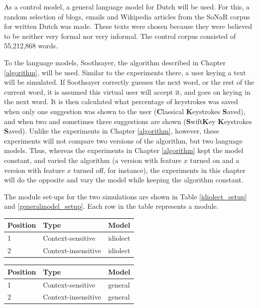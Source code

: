 \documentclass[11pt]{article}
\let\originaltable\table
\let\endoriginaltable\endtable
\renewenvironment{table}[1][ht]{%
  \originaltable[#1]
  \centering}%
  {\endoriginaltable}
\begin{document}
As a control model, a general language model for Dutch will be used. For this, a random selection of blogs, emails and Wikipedia articles from the SoNaR corpus for written Dutch \cite{oostdijk+13} was made. These texts were chosen because they were believed to be neither very formal nor very informal. The control corpus consisted of 55,212,868 words.

To the language models, Soothsayer, the algorithm described in Chapter \ref{algorithm}, will be used. Similar to the experiments there, a user keying a text will be simulated. If Soothsayer correctly guesses the next word, or the rest of the current word, it is assumed this virtual user will accept it, and goes on keying in the next word. It is then calculated what percentage of keystrokes was saved when only one suggestion was shown to the user (\textbf{C}lassical \textbf{K}eystrokes \textbf{S}aved), and when two and sometimes three suggestions are shown (\textbf{S}wift\textbf{K}ey \textbf{K}eystrokes \textbf{S}aved). Unlike the experiments in Chapter \ref{algorithm}, however, these experiments will not compare two versions of the algorithm, but two language models. Thus, whereas the experiments in Chapter \ref{algorithm} kept the model constant, and varied the algorithm (a version with feature $x$ turned on and a version with feature $x$ turned off, for instance), the experiments in this chapter will do the opposite and vary the model while keeping the algorithm constant. 

The module set-ups for the two simulations are shown in Table \ref{idiolect_setup} and \ref{generalmodel_setup}. Each row in the table represents a module.

\begin{table}[H]
\begin{tabular}{lll} 
Position&Type&Model\\
\hline
1&Context-sensitive&idiolect\\
2&Context-insensitive&idiolect\\
\end{tabular} 
\caption{Module order for a simple idiolect simulation.} \label{idiolect_setup}  
\end{table}

\begin{table}[H]
\begin{tabular}{lll} 
Position&Type&Model\\
\hline
1&Context-sensitive&general\\
2&Context-insensitive&general\\
\end{tabular} 
\caption{Module order for a simulation for the general model.} \label{generalmodel_setup} 
\end{table}
\end{document}
